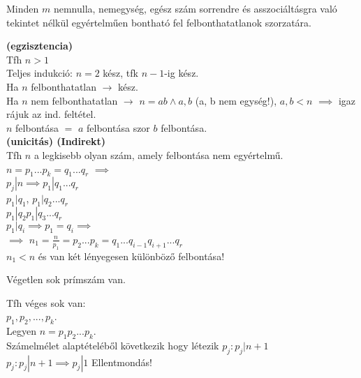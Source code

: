 \begin{frame}

\begin{tcolorbox}[title={Tétel: A számelmélet alaptétele}]
Minden $m$ nemnulla, nemegység, egész szám sorrendre és asszociáltásgra való tekintet nélkül egyértelműen bontható fel felbonthatatlanok szorzatára.
\end{tcolorbox}

\begin{tcolorbox}[title={Bizonyítás (Pozitívakra)}]
\textbf{(egzisztencia)}\\
Tfh $n > 1$\\
Teljes indukció: $n = 2$ kész, tfk $n - 1$-ig kész.\\
Ha $n$ felbonthatatlan $\rightarrow$ kész.\\
Ha $n$ nem felbonthatatlan $\rightarrow$ $n = ab \land a, b$ (a, b nem egység!), $a, b < n$ $\implies$ igaz rájuk az ind. feltétel.\\
$n$ felbontása $=$ $a$ felbontása szor $b$ felbontása.\\
\bigskip
\textbf{(unicitás) (Indirekt)}\\
Tfh $n$ a legkisebb olyan szám, amely felbontása nem egyértelmű.\\
$n = p_1 ... p_k = q_1 ... q_r$ $\implies$\\
$p_j|n \implies p_1|q_1 ... q_r$\\
$p_1|q_1$, $p_1|q_2 ... q_r$\\
           $p_1|q_2   p_1|q_3 ... q_r$\\
                      $p_1|q_i  \implies p_1 = q_i \implies$\\
$\implies$ $n_1 = \frac{n}{p_1} = p_2 ... p_k = q_1 ... q_{i-1}q_{i+1} ... q_r$\\
$n_1 < n$ és van két lényegesen különböző felbontása!
\end{tcolorbox}

\end{frame}

\begin{frame}

\begin{tcolorbox}[title={Tétel: Eukleidész tétele}]
Végetlen sok prímszám van.
\end{tcolorbox}

\begin{tcolorbox}[title={Bizonyítás (Indirekt)}]
Tfh véges sok van:\\
$p_1, p_2, ... ,p_k$.\\
Legyen $n = p_1p_2...p_k$.\\
Számelmélet alaptételéből következik hogy létezik $p_j : p_j | n + 1$\\
$p_j : p_j | n + 1 \implies p_j | 1$ Ellentmondás!
\end{tcolorbox}
\end{frame}


